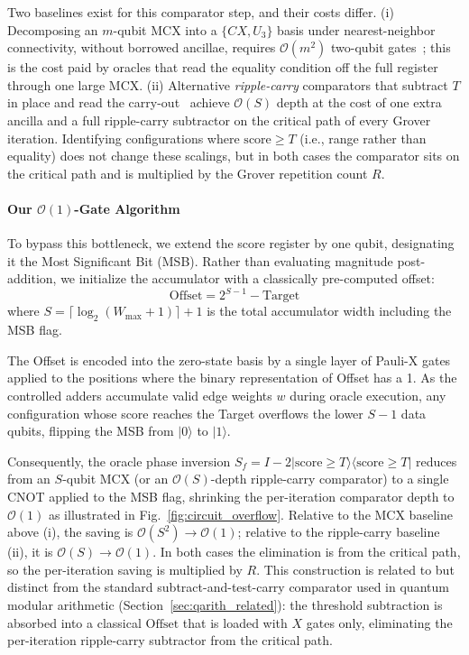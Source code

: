 \documentclass{ieeeaccess}
\begin{document}
Two baselines exist for this comparator step, and their costs differ. (i) Decomposing an $m$-qubit MCX into a $\{CX, U_3\}$ basis under nearest-neighbor connectivity, without borrowed ancillae, requires $\mathcal{O}(m^2)$ two-qubit gates~\cite{barenco1995,nielsen2010}; this is the cost paid by oracles that read the equality condition off the full register through one large MCX. (ii) Alternative \emph{ripple-carry} comparators that subtract $T$ in place and read the carry-out~\cite{thapliyal2010,oliveira2007} achieve $\mathcal{O}(S)$ depth at the cost of one extra ancilla and a full ripple-carry subtractor on the critical path of every Grover iteration. Identifying configurations where $\text{score} \ge T$ (i.e., range rather than equality) does not change these scalings, but in both cases the comparator sits on the critical path and is multiplied by the Grover repetition count $R$.

\paragraph{Our $\mathcal{O}(1)$-Gate Algorithm}
To bypass this bottleneck, we extend the score register by one qubit, designating it the Most Significant Bit (MSB). Rather than evaluating magnitude post-addition, we initialize the accumulator with a classically pre-computed offset:
\begin{equation}
\text{Offset} = 2^{S-1} - \text{Target}
\end{equation}
where $S = \lceil \log_2(W_{\max} + 1) \rceil + 1$ is the total accumulator width including the MSB flag.

The Offset is encoded into the zero-state basis by a single layer of Pauli-X gates applied to the positions where the binary representation of Offset has a 1. As the controlled adders accumulate valid edge weights $w$ during oracle execution, any configuration whose score reaches the Target overflows the lower $S{-}1$ data qubits, flipping the MSB from $|0\rangle$ to $|1\rangle$.

Consequently, the oracle phase inversion $S_f = I - 2|\text{score} \ge T\rangle\langle\text{score} \ge T|$ reduces from an $S$-qubit MCX (or an $\mathcal{O}(S)$-depth ripple-carry comparator) to a single CNOT applied to the MSB flag, shrinking the per-iteration comparator depth to $\mathcal{O}(1)$ as illustrated in Fig.~\ref{fig:circuit_overflow}. Relative to the MCX baseline above (i), the saving is $\mathcal{O}(S^2) \to \mathcal{O}(1)$; relative to the ripple-carry baseline (ii), it is $\mathcal{O}(S) \to \mathcal{O}(1)$. In both cases the elimination is from the critical path, so the per-iteration saving is multiplied by $R$. This construction is related to but distinct from the standard subtract-and-test-carry comparator used in quantum modular arithmetic (Section~\ref{sec:qarith_related}): the threshold subtraction is absorbed into a classical $\mathrm{Offset}$ that is loaded with $X$ gates only, eliminating the per-iteration ripple-carry subtractor from the critical path.
\end{document}

